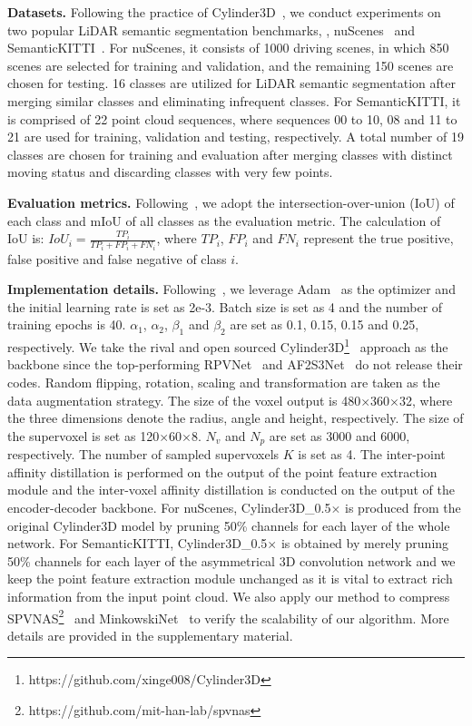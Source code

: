 

\noindent \textbf{Datasets.} Following the practice of Cylinder3D~\cite{zhu2021cylindrical}, we conduct experiments on two popular LiDAR semantic segmentation benchmarks, \ie, nuScenes~\cite{caesar2020nuscenes} and SemanticKITTI~\cite{behley2019semantickitti}. For nuScenes, it consists of 1000 driving scenes, in which 850 scenes are selected for training and validation, and the remaining 150 scenes are chosen for testing. 16 classes are utilized for LiDAR semantic segmentation after merging similar classes and eliminating infrequent classes. For SemanticKITTI, it is comprised of 22 point cloud sequences, where sequences 00 to 10, 08 and 11 to 21 are used for training, validation and testing, respectively. A total number of 19 classes are chosen for training and evaluation after merging classes with distinct moving status and discarding classes with very few points.

\noindent \textbf{Evaluation metrics.} Following~\cite{zhu2021cylindrical}, we adopt the intersection-over-union (IoU) of each class and mIoU of all classes as the evaluation metric. The calculation of IoU is: $IoU_{i} = \frac{TP_{i}}{TP_{i}+FP_{i}+FN_{i}}$, where $TP_{i}$, $FP_{i}$ and $FN_{i}$ represent the true positive, false positive and false negative of class $i$.

\noindent \textbf{Implementation details.} Following~\cite{zhu2021cylindrical}, we leverage Adam~\cite{kingma2015adam} as the optimizer and the initial learning rate is set as 2e-3. Batch size is set as 4 and the number of training epochs is 40. $\alpha_{1}$, $\alpha_{2}$, $\beta_{1}$ and $\beta_{2}$ are set as 0.1, 0.15, 0.15 and 0.25, respectively. We take the rival and open sourced Cylinder3D\footnote{https://github.com/xinge008/Cylinder3D}~\cite{zhu2021cylindrical} approach as the backbone since the top-performing RPVNet~\cite{Xu_2021_ICCV} and AF2S3Net~\cite{cheng20212} do not release their codes. Random flipping, rotation, scaling and transformation are taken as the data augmentation strategy. The size of the voxel output is 480$\times$360$\times$32, where the three dimensions denote the radius, angle and height, respectively. The size of the supervoxel is set as 120$\times$60$\times$8. $N_{v}$ and $N_{p}$ are set as 3000 and 6000, respectively. The number of sampled supervoxels $K$ is set as 4. The inter-point affinity distillation is performed on the output of the point feature extraction module and the inter-voxel affinity distillation is conducted on the output of the encoder-decoder backbone. For nuScenes, Cylinder3D\_0.5$\times$ is produced from the original Cylinder3D model by pruning 50\% channels for each layer of the whole network. For SemanticKITTI, Cylinder3D\_0.5$\times$ is obtained by merely pruning 50\% channels for each layer of the asymmetrical 3D convolution network and we keep the point feature extraction module unchanged as it is vital to extract rich information from the input point cloud. We also apply our method to compress SPVNAS\footnote{https://github.com/mit-han-lab/spvnas}~\cite{tang2020searching} and MinkowskiNet~\cite{choy20194d} to verify the scalability of our algorithm. More details are provided in the supplementary material. 

